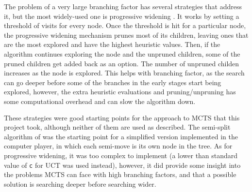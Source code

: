The problem of a very large branching factor has several strategies that address it, but the most widely-used one is progressive widening \cite{chaslot2008progressive}. It works by setting a threshold of visits for every node. Once the threshold is hit for a particular node, the progressive widening mechanism prunes most of its children, leaving ones that are the most explored and have the highest heuristic values. Then, if the algorithm continues exploring the node and the unpruned children, some of the pruned children get added back as an option. The number of unpruned childen increases as the node is explored. This helps with branching factor, as the search can go deeper before some of the branches in the early stages start being explored, however, the extra heuristic evaluations and pruning/unpruning has some computational overhead and can slow the algorithm down.

These strategies were good starting points for the approach to MCTS that this project took, although neither of them are used as described. The semi-split algorithm of \cite{kowalski2022split} was the starting point for a simplified version implemented in the computer player, in which each semi-move is its own node in the tree. As for progressive widening, it was too complex to implement (a lower than standard value of \texttt{c} for UCT was used instead), however, it did provide some insight into the problems MCTS can face with high branching factors, and that a possible solution is searching deeper before searching wider.

